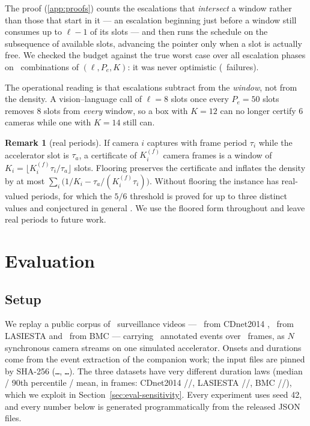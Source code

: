 \documentclass[preprint,review,12pt]{elsarticle}
\theoremstyle{definition}
\newtheorem{remark}[theorem]{Remark}
\newcommand{\Nc}{N}
\newcommand{\Ki}{K_i}
\begin{document}
The proof (\ref{app:proofs}) counts the escalations that \emph{intersect} a window rather than
those that start in it --- an escalation beginning just before a window still consumes up to
$\ell-1$ of its slots --- and then runs the schedule on the subsequence of available slots,
advancing the pointer only when a slot is actually free. We checked the budget against the true
worst case over all escalation phases on \numCfiveCells\ combinations of $(\ell,P_e,K)$: it was
never optimistic (\numCfiveFail\ failures).

The operational reading is that escalations subtract from the \emph{window}, not from the density.
A vision--language call of $\ell=8$ slots once every $P_e=50$ slots removes $8$ slots from
\emph{every} window, so a box with $K=12$ can no longer certify $6$ cameras while one with $K=14$
still can.

\begin{remark}[real periods]\label{rem:realperiods}
If camera $i$ captures with frame period $\tau_i$ while the accelerator slot is $\tau_a$, a
certificate of $K^{(f)}_i$ camera frames is a window of $\Ki=\lfloor K^{(f)}_i\tau_i/\tau_a\rfloor$
slots. Flooring preserves the certificate and inflates the density by at most
$\sum_i\big(1/\Ki-\tau_a/(K^{(f)}_i\tau_i)\big)$. Without flooring the instance has real-valued
periods, for which the $5/6$ threshold is proved for up to three distinct values and conjectured in
general \cite{fujiwara2026real}. We use the floored form throughout and leave real periods to
future work.
\end{remark}

\section{Evaluation}\label{sec:eval}

\subsection{Setup}\label{sec:eval-setup}
We replay a public corpus of \numVideos\ surveillance videos --- \numVidCDnet\ from CDnet2014
\cite{cdnet2014}, \numVidLASIESTA\ from LASIESTA \cite{lasiesta2016} and \numVidBMC\ from BMC
\cite{bmc2012} --- carrying \numEvents\ annotated events
over \numFrames\ frames, as $\Nc$ synchronous camera streams on one simulated accelerator. Onsets
and durations come from the event extraction of the companion work; the input files are pinned by
SHA-256 (\texttt{\numShaEvents\ldots}, \texttt{\numShaAct\ldots}). The three datasets have very
different duration laws (median / 90th percentile / mean, in frames: CDnet2014
\numMedCdnet/\numPninetyCdnet/\numMeanCdnet, LASIESTA
\numMedLasiesta/\numPninetyLasiesta/\numMeanLasiesta, BMC \numMedBmc/\numPninetyBmc/\numMeanBmc),
which we exploit in Section~\ref{sec:eval-sensitivity}. Every experiment uses seed 42, and every
number below is generated programmatically from the released JSON files.
\end{document}

